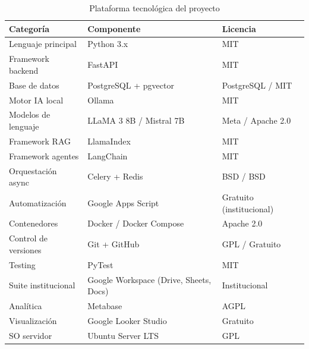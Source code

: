 \documentclass[a4paper, 12pt]{article}
\begin{document}
\begin{table}[htbp]
  \centering
  \caption{Plataforma tecnol\'ogica del proyecto}
  \label{tab:plataforma}
  \begin{tabularx}{\textwidth}{l>{\raggedright\arraybackslash}Xl}
    \toprule
    \textbf{Categor\'ia} & \textbf{Componente} & \textbf{Licencia} \\
    \midrule
    Lenguaje principal      & Python 3.x                             & MIT \\
    Framework backend       & FastAPI                                & MIT \\
    Base de datos           & PostgreSQL + pgvector                  & PostgreSQL / MIT \\
    Motor IA local          & Ollama                                 & MIT \\
    Modelos de lenguaje     & LLaMA 3 8B / Mistral 7B                & Meta / Apache 2.0 \\
    Framework RAG           & LlamaIndex                             & MIT \\
    Framework agentes       & LangChain                              & MIT \\
    Orquestaci\'on async    & Celery + Redis                         & BSD / BSD \\
    Automatizaci\'on        & Google Apps Script                     & Gratuito (institucional) \\
    Contenedores            & Docker / Docker Compose                & Apache 2.0 \\
    Control de versiones    & Git + GitHub                           & GPL / Gratuito \\
    Testing                 & PyTest                                 & MIT \\
    Suite institucional     & Google Workspace (Drive, Sheets, Docs) & Institucional \\
    Anal\'itica             & Metabase                               & AGPL \\
    Visualizaci\'on         & Google Looker Studio                   & Gratuito \\
    SO servidor             & Ubuntu Server LTS                      & GPL \\
    \bottomrule
  \end{tabularx}
\end{table}

\end{document}
